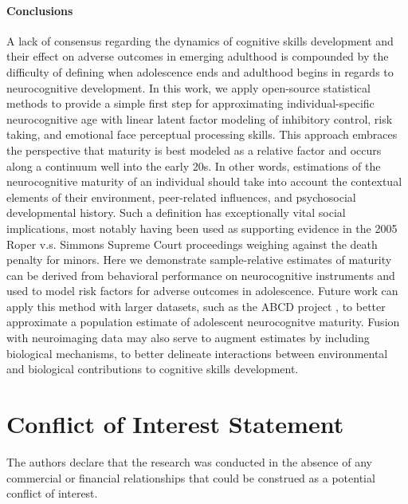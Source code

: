 \documentclass[utf8]{stylesheet}
\begin{document}
\paragraph*{Conclusions} A lack of consensus regarding the dynamics of cognitive skills development and their effect on adverse outcomes in emerging adulthood is compounded by the difficulty of defining when adolescence ends and adulthood begins in regards to neurocognitive development. In this work, we apply open-source statistical methods to provide a simple first step for approximating individual-specific neurocognitive age with linear latent factor modeling of inhibitory control, risk taking, and emotional face perceptual processing skills. This approach embraces the perspective that maturity is best modeled as a relative factor and occurs along a continuum well into the early 20s. In other words, estimations of the neurocognitive maturity of an individual should take into account the contextual elements of their environment, peer-related influences, and psychosocial developmental history. Such a definition has exceptionally vital social implications, most notably having been used as supporting evidence in the 2005 Roper v.s. Simmons Supreme Court proceedings weighing against the death penalty for minors. Here we demonstrate sample-relative estimates of maturity can be derived from behavioral performance on neurocognitive instruments and used to model risk factors for adverse outcomes in adolescence. Future work can apply this method with larger datasets, such as the ABCD project \citep{casey2018adolescent,volkow2018conception}, to better approximate a population estimate of adolescent neurocognitve maturity. Fusion with neuroimaging data may also serve to augment estimates by including biological mechanisms, to better delineate interactions between environmental and biological contributions to cognitive skills development.

\section*{Conflict of Interest Statement}
The authors declare that the research was conducted in the absence of any commercial or financial relationships that could be construed as a potential conflict of interest.
\end{document}
